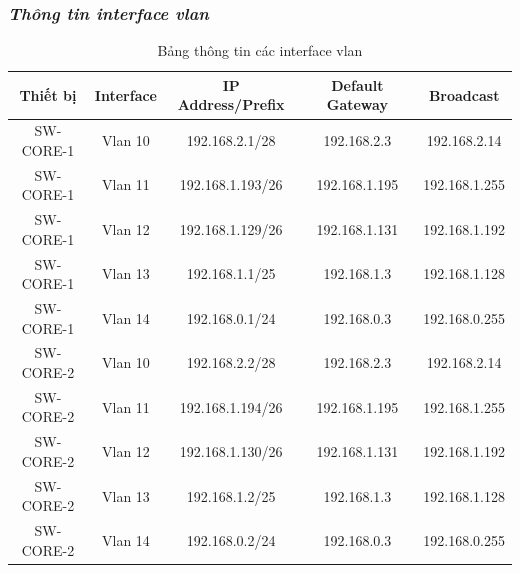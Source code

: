 \documentclass[12pt, a4paper]{article}
\begin{document}
	\subsubsection{\textit{Thông tin interface vlan}}
	
	\begin{table}[h]
		\centering
		\caption{Bảng thông tin các interface vlan}
		\begin{tabular}{|c|c|c|c|c|}
			\hline
			\textbf{Thiết bị} & \textbf{Interface} & \textbf{IP Address/Prefix} & \textbf{Default Gateway} & \textbf{Broadcast} \\
			\hline
			SW-CORE-1 & Vlan 10 & 192.168.2.1/28 & 192.168.2.3 & 192.168.2.14\\
			\hline
			SW-CORE-1 & Vlan 11 & 192.168.1.193/26 & 192.168.1.195 & 192.168.1.255\\
			\hline
			SW-CORE-1 & Vlan 12 & 192.168.1.129/26 & 192.168.1.131 & 192.168.1.192\\
			\hline
			SW-CORE-1 & Vlan 13 & 192.168.1.1/25 & 192.168.1.3 & 192.168.1.128\\
			\hline
			SW-CORE-1 & Vlan 14 & 192.168.0.1/24 & 192.168.0.3 & 192.168.0.255\\
			\hline
			SW-CORE-2 & Vlan 10 & 192.168.2.2/28 & 192.168.2.3 & 192.168.2.14\\
			\hline
			SW-CORE-2 & Vlan 11 & 192.168.1.194/26 & 192.168.1.195 & 192.168.1.255\\
			\hline
			SW-CORE-2 & Vlan 12 & 192.168.1.130/26 & 192.168.1.131 & 192.168.1.192\\
			\hline
			SW-CORE-2 & Vlan 13 & 192.168.1.2/25 & 192.168.1.3 & 192.168.1.128\\
			\hline
			SW-CORE-2 & Vlan 14 & 192.168.0.2/24 & 192.168.0.3 & 192.168.0.255\\
			\hline
		\end{tabular}
	\end{table}
	\newpage
\end{document}
